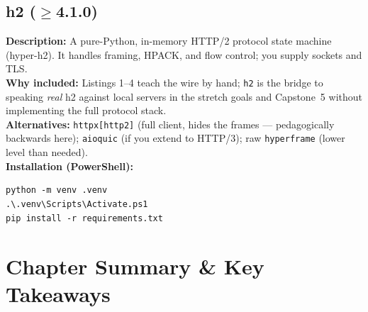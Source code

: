 \subsection{h2 ($\geq$4.1.0)}
\textbf{Description:} A pure-Python, in-memory HTTP/2 protocol state machine (hyper-h2). It handles framing, HPACK, and flow control; you supply sockets and TLS.\\
\textbf{Why included:} Listings 1--4 teach the wire by hand; \texttt{h2} is the bridge to speaking \emph{real} h2 against local servers in the stretch goals and Capstone~5 without implementing the full protocol stack.\\
\textbf{Alternatives:} \texttt{httpx[http2]} (full client, hides the frames --- pedagogically backwards here); \texttt{aioquic} (if you extend to HTTP/3); raw \texttt{hyperframe} (lower level than needed).\\
\textbf{Installation (PowerShell):}
\begin{verbatim}
python -m venv .venv
.\.venv\Scripts\Activate.ps1
pip install -r requirements.txt
\end{verbatim}

\section{Chapter Summary \& Key Takeaways}

